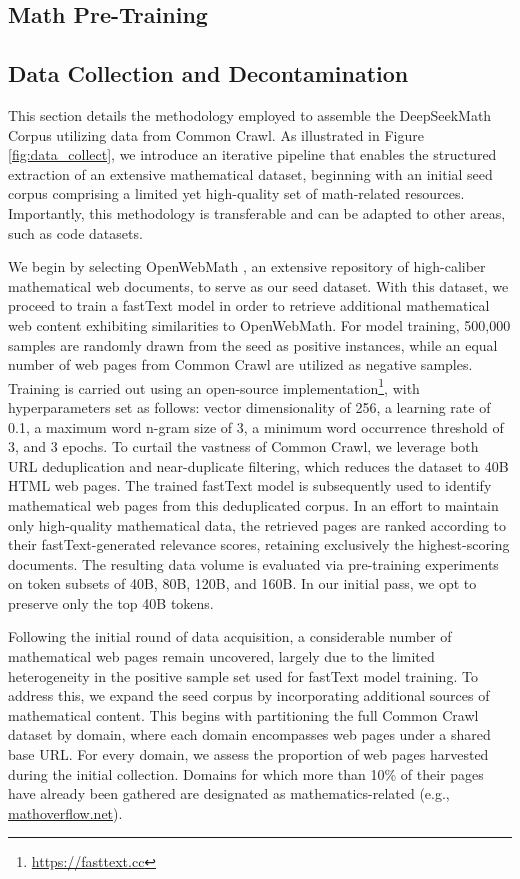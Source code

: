 \begin{itemize}[topsep=0pt]
\section{Math Pre-Training}

\subsection{Data Collection and Decontamination} This section details the methodology employed to assemble the DeepSeekMath Corpus utilizing data from Common Crawl. As illustrated in Figure \ref{fig:data_collect}, we introduce an iterative pipeline that enables the structured extraction of an extensive mathematical dataset, beginning with an initial seed corpus comprising a limited yet high-quality set of math-related resources. Importantly, this methodology is transferable and can be adapted to other areas, such as code datasets.

We begin by selecting OpenWebMath \citep{openwebmath}, an extensive repository of high-caliber mathematical web documents, to serve as our seed dataset. With this dataset, we proceed to train a fastText model \citep{joulin2016fasttext} in order to retrieve additional mathematical web content exhibiting similarities to OpenWebMath. For model training, 500,000 samples are randomly drawn from the seed as positive instances, while an equal number of web pages from Common Crawl are utilized as negative samples. Training is carried out using an open-source implementation\footnote{\url{https://fasttext.cc}}, with hyperparameters set as follows: vector dimensionality of 256, a learning rate of 0.1, a maximum word n-gram size of 3, a minimum word occurrence threshold of 3, and 3 epochs. To curtail the vastness of Common Crawl, we leverage both URL deduplication and near-duplicate filtering, which reduces the dataset to 40B HTML web pages. The trained fastText model is subsequently used to identify mathematical web pages from this deduplicated corpus. In an effort to maintain only high-quality mathematical data, the retrieved pages are ranked according to their fastText-generated relevance scores, retaining exclusively the highest-scoring documents. The resulting data volume is evaluated via pre-training experiments on token subsets of 40B, 80B, 120B, and 160B. In our initial pass, we opt to preserve only the top 40B tokens.

Following the initial round of data acquisition, a considerable number of mathematical web pages remain uncovered, largely due to the limited heterogeneity in the positive sample set used for fastText model training. To address this, we expand the seed corpus by incorporating additional sources of mathematical content. This begins with partitioning the full Common Crawl dataset by domain, where each domain encompasses web pages under a shared base URL. For every domain, we assess the proportion of web pages harvested during the initial collection. Domains for which more than 10\% of their pages have already been gathered are designated as mathematics-related (e.g., \url{mathoverflow.net}).


\end{itemize}
